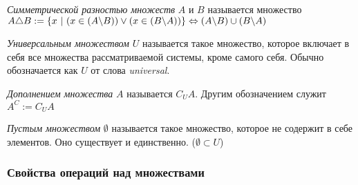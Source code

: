 \begin{definition}
    \textit{Симметрической разностью множеств} $A$ и $B$ называется множество $A \triangle B := \{x\ |\ (x \in (A \bs B)) \vee (x \in (B \bs A))\} \lra (A \bs B) \cup (B \bs A)$
\end{definition}

\begin{definition}
    \textit{Универсальным множеством} $U$ называется такое множество, которое включает в себя все множества рассматриваемой системы, кроме самого себя. Обычно обозначается как $U$ от слова \textit{universal}.
\end{definition}

\begin{definition}
    \textit{Дополнением множества} $A$ называется $C_U A$. Другим обозначением служит $A^C := C_U A$
\end{definition}

\begin{definition}
    \textit{Пустым множеством} $\emptyset$ называется такое множество, которое не содержит в себе элементов. Оно существует и единственно. ($\emptyset \subset U$)
\end{definition}


\subsubsection*{Свойства операций над множествами}

